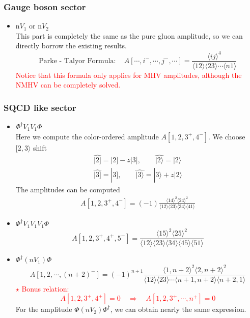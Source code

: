 \documentclass{beamer}
\newcommand{\aket}[1]{|#1\rangle}
\newcommand{\sket}[1]{|#1]}
\newcommand{\avg}[1]{\langle #1 \rangle}
\newcommand{\mdavg}[2]{\langle #1 \rangle\!\langle #2 \rangle}
\begin{document}
\begin{frame}
    \frametitle{Gauge boson sector}
    \begin{itemize}
        \item n$ V_1$ or n$V_2$\\
        This part is completely the same as the pure gluon amplitude, so we can directly borrow the
        existing results.
        \begin{equation*}
            \boxed{\text{Parke - Talyor Formula}:\quad A[\cdots,i^-,\cdots,j^-,\cdots]=\frac{\avg{ij}^4}{\avg{12}\!\avg{23}\cdots\avg{n1}}}
        \end{equation*}
        \textcolor{red}{Notice that this formula only applies for MHV amplitudes, although the NMHV can be completely solved.}
    \end{itemize}
\end{frame}

\begin{frame}
    \frametitle{SQCD like sector}
    \begin{itemize}
        \item $\Phi^\dagger V_1V_1\Phi$\\
        Here we compute the color-ordered amplitude $A[1,2,3^+,4^-]$. We choose $[2,3\rangle$ shift
        \begin{gather*}
        \hat{\sket{2}}=\sket{2}-z\sket{3},\qquad \hat{\aket{2}}=\aket{2} \\
        \hat{\sket{3}}=\sket{3},\qquad \hat{\aket{3}}=\aket{3}+z\aket{2}
        \end{gather*}
        The amplitudes can be computed 
        \begin{align*}
            A[1,2,3^+,4^-]=(-1)\frac{\avg{14}^2\avg{24}^2}{\mdavg{12}{23}\!\mdavg{34}{41}}
        \end{align*}
        \item $\Phi^\dagger V_1V_1V_1\Phi$
            \begin{equation*}
                A[1,2,3^+,4^+,5^-]=\frac{\avg{15}^2\!\avg{25}^2}{\mdavg{12}{23}\!\mdavg{34}{45}\!\avg{51}}
            \end{equation*}
    \end{itemize}
\end{frame}

\begin{frame}
    \begin{itemize}
        \item $\Phi^\dagger (nV_1)\Phi$
            \begin{equation*}
                A[1,2,\cdots,(n+2)^-]=(-1)^{n+1}\frac{\avg{1,n+2}^2\avg{2,n+2}^2}{\mdavg{12}{23}\cdots\mdavg{n+1,n+2}{n+2,1}}
            \end{equation*}
            \textcolor{red}{$\star$ Bonus relation: \begin{equation*}
                A[1,2,3^+,4^+]=0\quad \Rightarrow  \quad A[1,2,3^+,\cdots,n^+]=0 \end{equation*}}
        For the amplitude $\Phi (nV_2)\Phi^\dagger$, we can obtain nearly the same expression.
    \end{itemize}
\end{frame}
\end{document}
